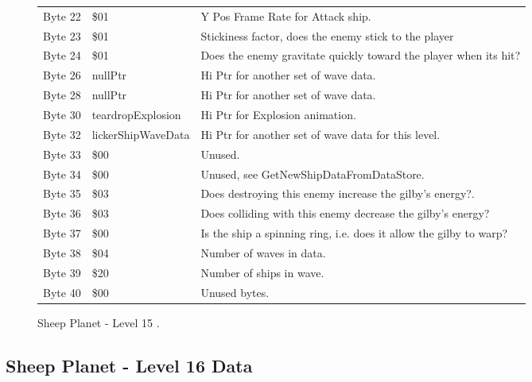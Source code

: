\begin{figure}[H]
{\begin{adjustbox}{width=12cm}
\begin{tabular}{lll}
 Byte 22 & \$01                & Y Pos Frame Rate for Attack ship.                                  \\
 Byte 23 & \$01                & Stickiness factor, does the enemy stick to the player              \\
 Byte 24 & \$01                & Does the enemy gravitate quickly toward the player when its hit?   \\
 Byte 26 & nullPtr            & Hi Ptr for another set of wave data.                               \\
 Byte 28 & nullPtr            & Hi Ptr for another set of wave data.                               \\
 Byte 30 & teardropExplosion  & Hi Ptr for Explosion animation.                                    \\
 Byte 32 & lickerShipWaveData & Hi Ptr for another set of wave data for this level.                \\
 Byte 33 & \$00                & Unused.                                                            \\
 Byte 34 & \$00                & Unused, see GetNewShipDataFromDataStore.                           \\
 Byte 35 & \$03                & Does destroying this enemy increase the gilby's energy?.           \\
 Byte 36 & \$03                & Does colliding with this enemy decrease the gilby's energy?        \\
 Byte 37 & \$00                & Is the ship a spinning ring, i.e. does it allow the gilby to warp? \\
 Byte 38 & \$04                & Number of waves in data.                                           \\
 Byte 39 & \$20                & Number of ships in wave.                                           \\
 Byte 40 & \$00                & Unused bytes.                                                      \\
\bottomrule
\end{tabular}

  \end{adjustbox}

  }\caption*{Sheep Planet - Level 15
.}
\end{figure}

\clearpage
\subsection{Sheep Planet - Level 16 Data}


